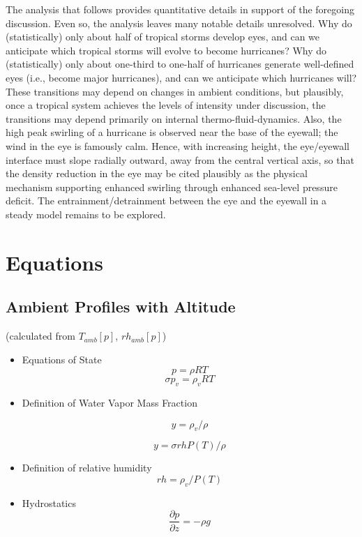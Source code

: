 \documentclass[preprint, prX]{revtex4}
\newcommand{\pd}[2]{\frac{\partial#1}{\partial#2}}
\begin{document}
The analysis that follows provides quantitative details in support of the foregoing discussion. Even so, the analysis leaves many notable details unresolved. Why do (statistically) only about half of tropical storms develop eyes, and can we anticipate which tropical storms will evolve to become hurricanes? Why do (statistically) only about one-third to one-half of hurricanes generate well-defined eyes (i.e., become major hurricanes), and can we anticipate which hurricanes will? These transitions may depend on changes in ambient conditions, but plausibly, once a tropical system achieves the levels of intensity under discussion, the transitions may depend primarily on internal thermo-fluid-dynamics. Also, the high peak swirling of a hurricane is observed near the base of the eyewall; the wind in the eye is famously calm. Hence, with increasing height, the eye/eyewall interface must slope radially outward, away from the central vertical axis, so that the density reduction in the eye may be cited plausibly as the physical mechanism supporting enhanced swirling through enhanced sea-level pressure deficit. The entrainment/detrainment between the eye and the eyewall in a steady model remains to be explored.

\section{Equations}

\subsection{Ambient Profiles with Altitude  }
(calculated from $T_{amb}[p]$, $ rh_{amb}[p]$)
\begin{itemize}

\item Equations of State
\begin{equation}
	p = \rho R T
\end{equation}
\begin{equation}
	\sigma p_v = \rho_v R T
\end{equation}

\item Definition of Water Vapor Mass Fraction

\begin{equation}
	y = \rho_v / \rho
\end{equation}

\begin{equation}
	y = \sigma rh P(T) / \rho
\end{equation}

\item Definition of relative humidity
\begin{equation}
	rh = \rho_v / P(T)
\end{equation}

\item Hydrostatics
\begin{equation}
	\pd{p}{z} = -\rho g
\end{equation}

\end{itemize}
\end{document}
